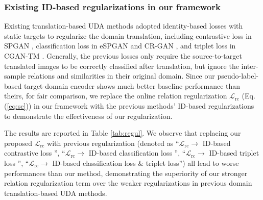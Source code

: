 \documentclass[journal]{IEEEtran}
\begin{document}
\subsubsection{\textbf{Existing ID-based regularizations in our framework}}
\label{sec:com_dt_2}
Existing translation-based UDA methods \cite{deng2018image,wei2018person,deng2018similarity,chen2019instance} adopted identity-based losses with static targets to regularize the domain translation, including contrastive loss in SPGAN \cite{deng2018image}, classification loss in eSPGAN \cite{deng2018similarity} and CR-GAN \cite{chen2019instance}, and triplet loss in CGAN-TM \cite{tang2020cgan}. Generally, the previous losses only require the source-to-target translated images to be correctly classified after translation,  {but ignore the inter-sample relations and similarities in their original domain}.
Since our pseudo-label-based target-domain encoder shows much better baseline performance than theirs,
for fair comparison,
we replace the online relation regularization $\mathcal{L}_\text{rc}$ (Eq. (\ref{eq:sc})) in our framework with the previous methods' ID-based regularizations to demonstrate the effectiveness of our regularization.

The results are reported in Table \ref{tab:regul}.
We observe that replacing our proposed $\mathcal{L}_\text{rc}$ with previous regularization (denoted as ``$\mathcal{L}_\text{rc} \to$ ID-based contrastive loss \cite{deng2018image}'', ``$\mathcal{L}_\text{rc} \to$ ID-based classification loss  \cite{deng2018similarity,chen2019instance,zou2020joint}'',
``$\mathcal{L}_\text{rc} \to$ ID-based triplet loss \cite{tang2020cgan}'',  {``$\mathcal{L}_\text{rc} \to$ ID-based classification loss \& triplet loss''}) all lead to worse performances than our method, demonstrating the superiority of our stronger relation regularization term over the weaker regularizations in previous domain translation-based UDA methods.
\end{document}
